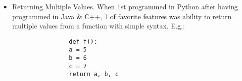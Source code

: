 \documentclass{article}
\newtheorem{remark}{Remark}
\begin{document}
\begin{itemize}
\begin{itemize}
\begin{itemize}
\begin{verbatim}
				In [191]: def bind_a_variable():
				.....:     global a
				.....:     a = []
				.....: bind_a_variable(a)
				.....:
				In [192]: print(a)
				[]
			\end{verbatim}
			{\tt nonlocal} allows a function to modify variables defined in a higher-level scope that is not global. Since its use is somewhat esoteric (bí truyền, bí mật) (I never use it in this book), refer to Python documentation to learn more about it.
			\begin{remark}
				Generally discourage use of {\tt global} keyword. Typically, global variables are used to store some kind of state in a system. If fiond yourself using a lot of them, it may indicate a need for object-oriented programming (using classes).
			\end{remark}
			\item {\sf Returning Multiple Values.} When 1st programmed in Python after having programmed in Java \& C++, 1 of favorite features was ability to return multiple values from a function with simple syntax. E.g.:
			\begin{verbatim}
				def f():
				a = 5
				b = 6
				c = 7
				return a, b, c
				

\end{verbatim}
\end{itemize}
\end{itemize}
\end{itemize}
\end{document}
